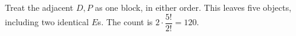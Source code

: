 Treat the adjacent $D,P$ as one block, in either order. This leaves five objects, including two identical $E$s. The count is $2\cdot\dfrac{5!}{2!}=\boxed{120}$.
